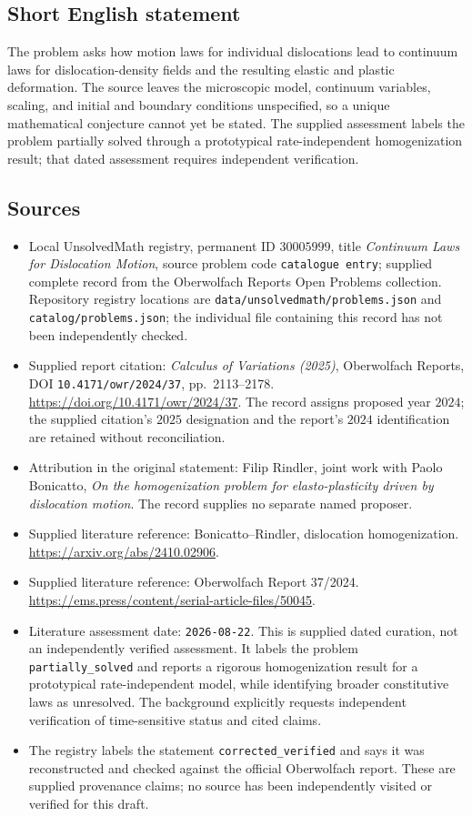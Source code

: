 \documentclass[11pt]{article}
\begin{document}
\subsection{Short English statement}
The problem asks how motion laws for individual dislocations lead to continuum laws for dislocation-density fields and the resulting elastic and plastic deformation. The source leaves the microscopic model, continuum variables, scaling, and initial and boundary conditions unspecified, so a unique mathematical conjecture cannot yet be stated. The supplied assessment labels the problem partially solved through a prototypical rate-independent homogenization result; that dated assessment requires independent verification.
\subsection{Sources}
\begin{itemize}
\item Local UnsolvedMath registry, permanent ID \(30005999\), title \emph{Continuum Laws for Dislocation Motion}, source problem code \texttt{catalogue entry}; supplied complete record from the Oberwolfach Reports Open Problems collection. Repository registry locations are \texttt{data/unsolvedmath/problems.json} and \texttt{catalog/problems.json}; the individual file containing this record has not been independently checked.
\item Supplied report citation: \emph{Calculus of Variations (2025)}, Oberwolfach Reports, DOI \texttt{10.4171/owr/2024/37}, pp.\ 2113--2178. \url{https://doi.org/10.4171/owr/2024/37}. The record assigns proposed year \(2024\); the supplied citation's \(2025\) designation and the report's \(2024\) identification are retained without reconciliation.
\item Attribution in the original statement: Filip Rindler, joint work with Paolo Bonicatto, \emph{On the homogenization problem for elasto-plasticity driven by dislocation motion}. The record supplies no separate named proposer.
\item Supplied literature reference: Bonicatto--Rindler, dislocation homogenization. \url{https://arxiv.org/abs/2410.02906}.
\item Supplied literature reference: Oberwolfach Report 37/2024. \url{https://ems.press/content/serial-article-files/50045}.
\item Literature assessment date: \texttt{2026-08-22}. This is supplied dated curation, not an independently verified assessment. It labels the problem \texttt{partially\_solved} and reports a rigorous homogenization result for a prototypical rate-independent model, while identifying broader constitutive laws as unresolved. The background explicitly requests independent verification of time-sensitive status and cited claims.
\item The registry labels the statement \texttt{corrected\_verified} and says it was reconstructed and checked against the official Oberwolfach report. These are supplied provenance claims; no source has been independently visited or verified for this draft.
\end{itemize}
\end{document}
